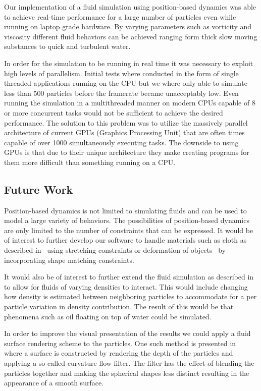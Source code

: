 Our implementation of a fluid simulation using position-based dynamics was able
to achieve real-time performance for a large number of particles even while
running on laptop grade hardware. By varying parameters such as vorticity and
viscosity different fluid behaviors can be achieved ranging form thick slow
moving substances to quick and turbulent water.

In order for the simulation to be running in real time it was necessary to
exploit high levels of parallelism. Initial tests where conducted in the form
of single threaded applications running on the CPU but we where only able to
simulate less than 500 particles before the framerate became unacceptably low.
Even running the simulation in a multithreaded manner on modern CPUs capable of
8 or more concurrent tasks would not be sufficient to achieve the desired
performance. The solution to this problem was to utilize the massively parallel
architecture of current GPUs (Graphics Processing Unit) that are often times
capable of over 1000 simultaneously executing tasks. The downside to using GPUs
is that due to their unique architecture they make creating programs for them
more difficult than something running on a CPU.

\subsection{Future Work}
Position-based dynamics is not limited to simulating
fluids and can be used to model a large variety of behaviors. The possibilities
of position-based dynamics are only limited to the number of constraints that
can be expressed. It would be of interest to further develop our software to
handle materials such as cloth as described in~\cite{muller2007position} using
stretching constraints or deformation of objects~\cite{muller2005meshless} by
incorporating shape matching constraints.

It would also be of interest to further extend the fluid simulation as
described in~\cite{macklin2014unified} to allow for fluids of varying densities
to interact. This would include changing how density is estimated between
neighboring particles to accommodate for a per particle variation in density
contribution. The result of this would be that phenomena such as oil floating
on top of water could be simulated.

In order to improve the visual presentation of the results we could apply a
fluid surface rendering scheme to the particles. One such method is presented
in~\cite{van2009screen} where a surface is constructed by rendering the depth
of the particles and applying a so called curvature flow filter. The filter has
the effect of blending the particles together and making the spherical shapes
less distinct resulting in the appearance of a smooth surface.
